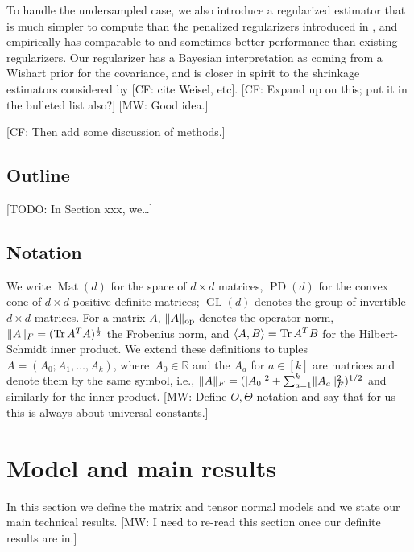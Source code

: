 \documentclass[aos]{imsart}
\theoremstyle{definition}
\numberwithin{equation}{section}
\DeclareMathOperator{\op}{op}
\DeclareMathOperator{\mat}{Mat}
\DeclareMathOperator{\GL}{GL}
\DeclareMathOperator{\tr}{Tr}
\DeclareMathOperator{\PD}{PD}
\DeclarePairedDelimiter{\abs}{\lvert}{\rvert}
\DeclarePairedDelimiter{\norm}{\lVert}{\rVert}
\newcommand{\R}{{\mathbb{R}}}
\newcommand{\CF}[1]{{\color{purple}[CF: #1]}}
\newcommand{\MW}[1]{{\color{red}[MW: #1]}}
\newcommand{\TODO}[1]{{\color{blue}[TODO: #1]}}
\begin{document}
To handle the undersampled case, we also introduce a regularized estimator that is much simpler to compute than the penalized regularizers introduced in \cite{tsiligkaridis2013convergence,sun2015nonconvex,zhou2014gemini}, and empirically has comparable to and sometimes better performance than existing regularizers.
Our regularizer has a Bayesian interpretation as coming from a Wishart prior for the covariance, and is closer in spirit to the shrinkage estimators considered by \CF{cite Weisel, etc}.
\CF{Expand up on this; put it in the bulleted list also?}
\MW{Good idea.}

\CF{Then add some discussion of methods.}

\subsection{Outline}
\TODO{In Section xxx, we\dots}

\subsection{Notation}
We write $\mat(d)$ for the space of $d\times d$ matrices, $\PD(d)$ for the convex cone of $d\times d$ positive definite matrices; $\GL(d)$ denotes the group of invertible $d\times d$ matrices.
For a matrix $A$, $\norm{A}_{\op}$ denotes the operator norm, $\norm{A}_F = (\tr A^T A)^{\frac12}$ the Frobenius norm, and $\braket{A,B} = \tr A^T B$ for the Hilbert-Schmidt inner product.
We extend these definitions to tuples $A=(A_0;A_1,\dots,A_k)$, where~$A_0\in\R$ and the $A_a$ for $a\in[k]$ are matrices and denote them by the same symbol, i.e., $\norm{A}_F = (\abs{A_0}^2 + \sum_{a=1}^k \norm{A_a}_F^2)^{1/2}$ and similarly for the inner product.
\MW{Define $O, \Theta$ notation and say that for us this is always about universal constants.}

\section{Model and main results}\label{sec:main results}
In this section we define the matrix and tensor normal models and we state our main technical results.
\MW{I need to re-read this section once our definite results are in.}
\end{document}
